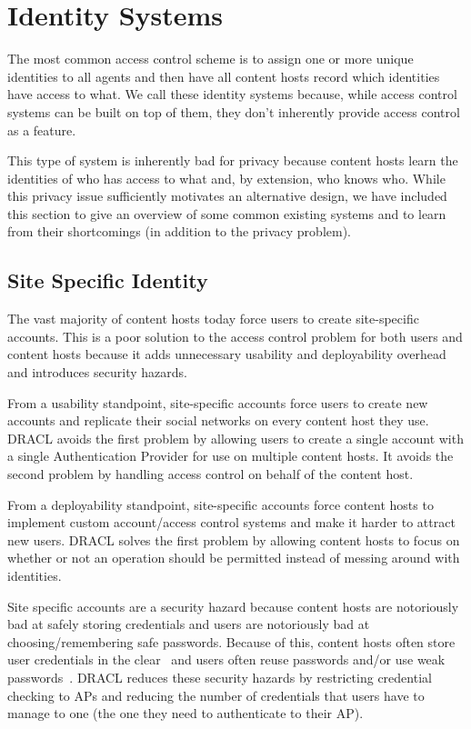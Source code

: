 \documentclass[pdftex,12pt,a4papaer]{report}
\begin{document}
\section{Identity Systems}

The most common access control scheme is to assign one or more unique identities
to all agents and then have all content hosts record which identities have
access to what. We call these identity systems because, while access control
systems can be built on top of them, they don't inherently provide access
control as a feature.

This type of system is inherently bad for privacy because content hosts learn
the identities of who has access to what and, by extension, who knows who. While
this privacy issue sufficiently motivates an alternative design, we have
included this section to give an overview of some common existing systems and to
learn from their shortcomings (in addition to the privacy problem).

\subsection{Site Specific Identity}

The vast majority of content hosts today force users to create site-specific
accounts. This is a poor solution to the access control problem for both users
and content hosts because it adds unnecessary usability and deployability
overhead and introduces security hazards.


From a usability standpoint, site-specific accounts force users to create new
accounts and replicate their social networks on every content host they use.
DRACL avoids the first problem by allowing users to create a single account with
a single Authentication Provider for use on multiple content hosts. It avoids
the second problem by handling access control on behalf of the content host.

From a deployability standpoint, site-specific accounts force content hosts to
implement custom account/access control systems and make it harder to attract
new users. DRACL solves the first problem by allowing content hosts to focus on
whether or not an operation should be permitted instead of messing around with
identities.

Site specific accounts are a security hazard because content hosts are
notoriously bad at safely storing credentials and users are notoriously bad at
choosing/remembering safe passwords. Because of this, content hosts often store
user credentials in the clear~\cite{plaintext} and users often reuse passwords
and/or use weak passwords~\cite{ms-passwords}. DRACL reduces these security
hazards by restricting credential checking to APs and reducing the number of
credentials that users have to manage to one (the one they need to authenticate
to their AP).
\end{document}
